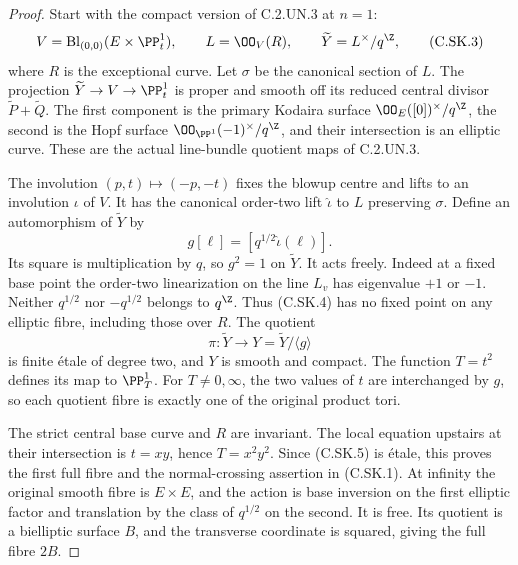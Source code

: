 \begin{proof}
Start with the compact version of C.2.UN.3 at $n=1$:
\[
 V=\operatorname{Bl}_{(0,0)}(E\times\PP^1_t),\qquad
 L=\OO_V(R),\qquad
 \widetilde Y=L^\times/q^{\Z},
                                                            \tag{C.SK.3}
\]
where $R$ is the exceptional curve. Let $\sigma$ be
the canonical section of $L$. The projection
$\widetilde Y\to V\to\PP^1_t$ is proper and smooth
off its reduced central divisor
$\widetilde P+\widetilde Q$. The first component is
the primary Kodaira surface
$\OO_E([0])^\times/q^{\Z}$, the second is the Hopf
surface $\OO_{\PP^1}(-1)^\times/q^{\Z}$, and their
intersection is an elliptic curve. These are the
actual line-bundle quotient maps of C.2.UN.3.

The involution $(p,t)\mapsto(-p,-t)$ fixes the blowup
centre and lifts to an involution $\iota$ of $V$.
It has the canonical order-two lift $\widehat\iota$
to $L$ preserving $\sigma$. Define an automorphism
of $\widetilde Y$ by
\[
             g[\ell]=[q^{1/2}\widehat\iota(\ell)].
                                                            \tag{C.SK.4}
\]
Its square is multiplication by $q$, so $g^2=1$
on $\widetilde Y$. It acts freely. Indeed at a
fixed base point the order-two linearization on
the line $L_v$ has eigenvalue $+1$ or $-1$.
Neither $q^{1/2}$ nor $-q^{1/2}$ belongs to
$q^{\Z}$. Thus (C.SK.4) has no fixed point on
any elliptic fibre, including those over $R$.
The quotient
\[
              \pi:\widetilde Y\longrightarrow Y
                        =\widetilde Y/\langle g\rangle
                                                            \tag{C.SK.5}
\]
is finite \'etale of degree two, and $Y$ is smooth
and compact. The function $T=t^2$ defines its map
to $\PP^1_T$. For $T\ne0,\infty$, the two values
of $t$ are interchanged by $g$, so each quotient
fibre is exactly one of the original product
tori.

The strict central base curve and $R$ are
invariant. The local equation upstairs at their
intersection is $t=xy$, hence $T=x^2y^2$.
Since (C.SK.5) is \'etale, this proves the first
full fibre and the normal-crossing assertion
in (C.SK.1). At infinity the original smooth
fibre is $E\times E$, and the action is base
inversion on the first elliptic factor and
translation by the class of $q^{1/2}$ on the
second. It is free. Its quotient is a
bielliptic surface $B$, and the transverse
coordinate is squared, giving the full fibre
$2B$.


\end{proof}
